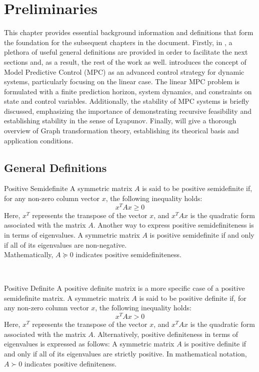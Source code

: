 \chapter{Preliminaries}\label{ch:preliminaries}
This chapter provides essential background information and definitions that form the foundation for the subsequent chapters in the document. Firstly, in , a plethora of useful general definitions are provided in order to facilitate the next sections and, as a result, the rest of the work as well.  introduces the concept of Model Predictive Control (MPC) as an advanced control strategy for dynamic systems, particularly focusing on the linear case. The linear MPC problem is formulated with a finite prediction horizon, system dynamics, and constraints on state and control variables. Additionally, the stability of MPC systems is briefly discussed, emphasizing the importance of demonstrating recursive feasibility and establishing stability in the sense of Lyapunov. Finally,  will give a thorough overview of Graph transformation theory, establishing its theorical basis and application conditions. 

\section{General Definitions}\label{sec:general_definitions}
\begin{definition}{Positive Semidefinite}
	A symmetric matrix $A$ is said to be positive semidefinite if, for any non-zero column vector $x$, the following inequality holds:
	\begin{equation}
		x^T Ax \geq 0
	\end{equation}
	Here, $x^T$ represents the transpose of the vector $x$, and $x^T Ax$ is the quadratic form associated with the matrix $A$. Another way to express positive semidefiniteness is in terms of eigenvalues. A symmetric matrix $A$ is positive semidefinite if and only if all of its eigenvalues are non-negative.\\
	Mathematically, $A \succeq 0 $ indicates positive semidefiniteness.
\end{definition}\\



\begin{definition}{Positive Definite}
	A positive definite matrix is a more specific case of a positive semidefinite matrix. A symmetric matrix $A$ is said to be positive definite if, for any non-zero column vector $x$, the following inequality holds:
	\begin{equation}
		x^T Ax > 0
	\end{equation}
	Here, $x^T$ represents the transpose of the vector $x$, and $x^T Ax$ is the quadratic form associated with the matrix $A$. Alternatively, positive definiteness in terms of eigenvalues is expressed as follows: A symmetric matrix $A$ is positive definite if and only if all of its eigenvalues are strictly positive.
	In mathematical notation, $A \succ 0$ indicates positive definiteness.
\end{definition}\\



